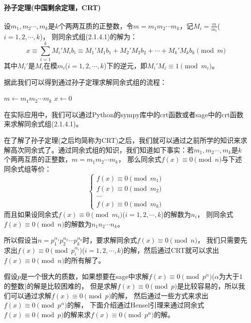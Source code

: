 \documentclass{article}
\numberwithin{equation}{subsubsection}
\begin{document}
\paragraph{孙子定理(中国剩余定理，CRT)}
设$m_1,m_2\cdots,m_k$是$k$个两两互质的正整数，令$m=m_1m_2\cdots m_k$，记$M_i=\frac{m}{m_i}$($i=1,2,\cdots,k$)，
则同余式组(2.1.4.1)的解为：
\begin{equation}
    x\equiv \sum_{i=1}^{k}M_i'M_ib_i\equiv M_1'M_1b_1+M_2'M_2b_2+\cdots+M_k'M_kb_k\pmod{m}
    \nonumber
\end{equation}
其中$M_i'$是$M_i$在模$m_i$($i=1,2,\cdots,k$)下的逆元，即$M_i'M_i\equiv 1\pmod{m_i}$。\par
据此我们可以得到通过孙子定理求解同余式组的流程：
\begin{algorithm}
    \caption{$\text{CRT}(b_1,b_2,\cdots,b_k;m_1,m_2,\cdots,m_k)$}
    $m\leftarrow m_1m_2\cdots m_k$
    $x\leftarrow 0$\\
\end{algorithm}\par
在实际应用中，我们可以通过Python的sympy库中的crt函数或者sage中的crt函数来求解同余式组(2.1.4.1)。\par
在了解了孙子定理(之后均简称为CRT)之后，我们就可以通过之前所学的知识来求解高次同余式了。通过同余式组的知识，我们知道如下事实：若$m_1,m_2\cdots,m_k$是$k$个两两互质的正整数，$m= m_1m_2\cdots m_k$，
那么同余式$f(x)\equiv 0\pmod{n}$与下述同余式组等价：
\begin{equation}
    \begin{cases}
        f(x)\equiv 0\pmod{m_1}\\
        f(x)\equiv 0\pmod{m_2}\\
        \cdots\\
        f(x)\equiv 0\pmod{m_k}
    \end{cases}
    \nonumber
\end{equation}
而且如果设同余式$f(x)\equiv 0\pmod{m_i}$($i=1,2,\cdots,k$)的解数为$n_i$，
则同余式$f(x)\equiv 0\pmod{n}$的解数为$n_1n_2\cdots n_k$。\par
所以假设当$n=p_1^{\alpha_1}p_2^{\alpha_2}\cdots p_k^{\alpha_k}$时，要求解同余式$f(x)\equiv 0\pmod{n}$，
我们只需要先求出$f(x)\equiv 0\pmod{p_i^{\alpha_i}}$($i=1,2,\cdots,k$)的解，然后通过CRT就可以求出$f(x)\equiv 0\pmod{n}$的所有解了。\par
假设$p$是一个很大的质数，如果想要在sage中求解$f(x)\equiv 0\pmod{p^\alpha}$($\alpha$为大于$1$的整数)的解是比较困难的，
但是求解$f(x)\equiv 0\pmod{p}$是比较容易的，所以我们可以通过求解$f(x)\equiv 0\pmod{p}$的解，
然后通过一些方式来求出$f(x)\equiv 0\pmod{p^\alpha}$的解，
下面介绍通过Hensel引理来通过同余式$f(x)\equiv 0\pmod{p}$的解来求$f(x)\equiv 0\pmod{p^\alpha}$的解。\par
\end{document}
